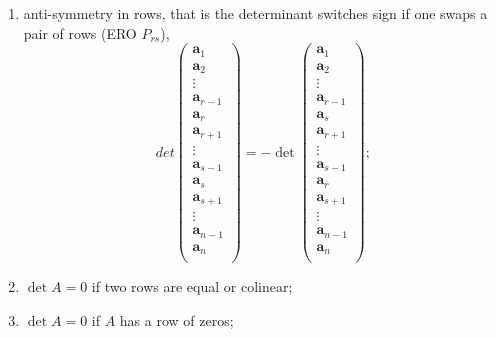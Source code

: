 \begin{enumerate}
    \item anti-symmetry in rows, that is the determinant switches sign if one swaps a pair of rows (ERO $P_{rs}$),
    \[
        det{
            \begin{pmatrix}
                \bm a_1\\
                \bm a_2\\
                \vdots\\
                \bm a_{r-1}\\
                \bm a_r\\
                \bm a_{r+1}\\
                \vdots\\
                \bm a_{s-1}\\
                \bm a_s\\
                \bm a_{s+1}\\
                \vdots\\
                \bm a_{n-1}\\
                \bm a_n\\
            \end{pmatrix}
        }
        =-
        \det{
            \begin{pmatrix}
                \bm a_1\\
                \bm a_2\\
                \vdots\\
                \bm a_{r-1}\\
                \bm a_s\\
                \bm a_{r+1}\\
                \vdots\\
                \bm a_{s-1}\\
                \bm a_r\\
                \bm a_{s+1}\\
                \vdots\\
                \bm a_{n-1}\\
                \bm a_n\\
            \end{pmatrix}
        }
        ;
    \]
    
    \item $\det{A}=0$ if two rows are equal or colinear;
     
    \item $\det{A}=0$ if $A$ has a row of zeros;
     

\end{enumerate}
